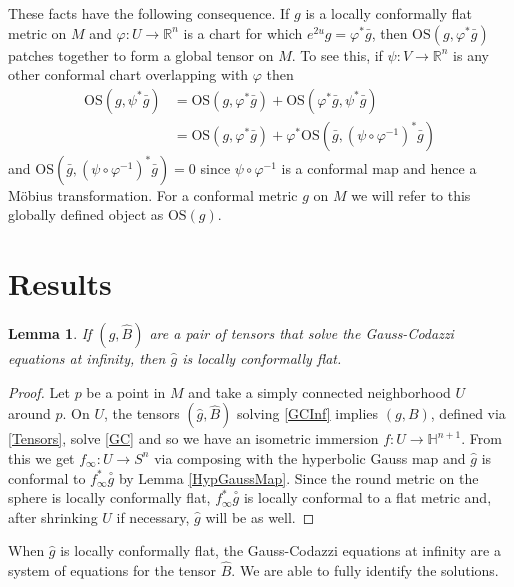 \documentclass{amsart}
\newcommand{\R}{\mathbb{R}}
\newtheorem{lem}[thm]{Lemma}
\renewcommand{\H}{\mathbb{H}}
\begin{document}
These facts have the following consequence. 
If $g$ is a locally conformally flat metric on $M$ and $\varphi: U \to \R^n$ is a chart for which $e^{2u}g = \varphi^*\bar{g}$, then $\mathrm{OS}(g, \varphi^*\bar{g})$ patches together to form a global tensor on $M$. 
To see this, if $\psi: V \to \R^n$ is any other conformal chart overlapping with $\varphi$ then 
\begin{align*}
\mathrm{OS}(g ,\psi^*\bar{g}) 
&= \mathrm{OS}(g, \varphi^*\bar{g}) + \mathrm{OS}(\varphi^*\bar{g},\psi^*\bar{g}) \\
&= \mathrm{OS}(g, \varphi^*\bar{g}) + \varphi^*\mathrm{OS}(\bar{g},(\psi \circ \varphi^{-1})^*\bar{g})
\end{align*}
and $\mathrm{OS}(\bar{g},(\psi \circ \varphi^{-1})^*\bar{g}) = 0$ since $\psi \circ \varphi^{-1}$ is a conformal map and hence a M\"obius transformation.
For a conformal metric $g$ on $M$ we will refer to this globally defined object as $\mathrm{OS}(g)$.

\section{Results}

\begin{lem}
\label{GCInf-LCF}
If $(\hat{g},\hat{B})$ are a pair of tensors that solve the Gauss-Codazzi equations at infinity, then $\hat{g}$ is locally conformally flat. 
\end{lem}

\begin{proof}
Let $p$ be a point in $M$ and take a simply connected neighborhood $U$ around $p$.
On $U$, the tensors $(\hat{g},\hat{B})$ solving \ref{GCInf} implies $(g,B)$, defined via \eqref{Tensors}, solve \ref{GC} and so we have an isometric immersion $f: U \to \H^{n+1}$.
From this we get $f_\infty: U \to S^n$ via composing with the hyperbolic Gauss map and $\hat{g}$ is conformal to $f_\infty^*\overset{\circ}{g}$ by Lemma \ref{HypGaussMap}. 
Since the round metric on the sphere is locally conformally flat, $f_\infty^*\overset{\circ}{g}$ is locally conformal to a flat metric and, after shrinking $U$ if necessary, $\hat{g}$ will be as well. 
\end{proof}

When $\hat{g}$ is locally conformally flat, the Gauss-Codazzi equations at infinity are a system of equations for the tensor $\hat{B}$.
We are able to fully identify the solutions. 
\end{document}

